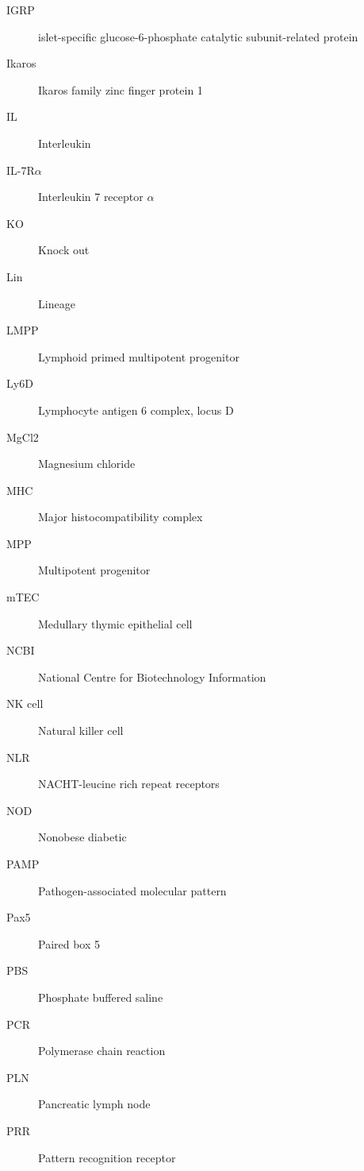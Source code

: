 \begin{description}
\item[IGRP]
islet-specific glucose-6-phosphate catalytic subunit-related protein

\item[Ikaros]
Ikaros family zinc finger protein 1

\item[IL]
Interleukin

\item[IL-7R$\alpha$]
Interleukin 7 receptor $\alpha$

\item[KO]
Knock out

\item[Lin]
Lineage

\item[LMPP]
Lymphoid primed multipotent progenitor

\item[Ly6D]
Lymphocyte antigen 6 complex, locus D

\item[MgCl2]
Magnesium chloride

\item[MHC]
Major histocompatibility complex

\item[MPP]
Multipotent progenitor

\item[mTEC]
Medullary thymic epithelial cell

\item[NCBI]
National Centre for Biotechnology Information

\item[NK cell]
Natural killer cell

\item[NLR]
NACHT-leucine rich repeat receptors

\item[NOD]
Nonobese diabetic

\item[PAMP]
Pathogen-associated molecular pattern

\item[Pax5]
Paired box 5

\item[PBS]
Phosphate buffered saline

\item[PCR]
Polymerase chain reaction

\item[PLN]
Pancreatic lymph node

\item[PRR]
Pattern recognition receptor


\end{description}
